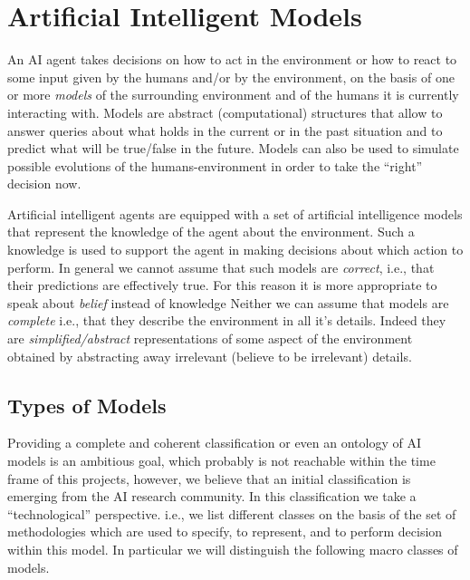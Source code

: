 \section{Artificial Intelligent Models}
An AI agent takes decisions on how to act in the environment or how to
react to some input given by the humans and/or by the environment, on
the basis of one or more \emph{models} of the surrounding environment
and of the humans it is currently interacting with. Models are
abstract (computational) structures that allow to answer queries about
what holds in the current or in the past situation and to predict what
will be true/false in the future. Models can also be used to simulate
possible evolutions of the humans-environment in order to take the
``right'' decision now.

Artificial intelligent agents are equipped with a set of artificial
intelligence models that represent the knowledge of the agent about
the environment. Such a knowledge is used to support the agent in
making decisions about which action to perform. In general we cannot
assume that such models are \emph{correct}, i.e., that their
predictions are effectively true.  For this reason it is more
appropriate to speak about \emph{belief} instead of knowledge Neither
we can assume that models are \emph{complete} i.e., that they describe
the environment in all it's details. Indeed they are
\emph{simplified/abstract} representations of some aspect of the
environment obtained by abstracting away irrelevant (believe to be
irrelevant) details.

\subsection{Types of Models}

Providing a complete and coherent classification or even an ontology
of AI models is an ambitious goal, which probably is not reachable
within the time frame of this projects, however, we believe that an
initial classification is emerging from the AI research community. In
this classification we take a ``technological'' perspective. i.e., we
list different classes on the basis of the set of methodologies which
are used to specify, to represent, and to perform decision within this
model. In particular we will distinguish the following macro classes
of models.


